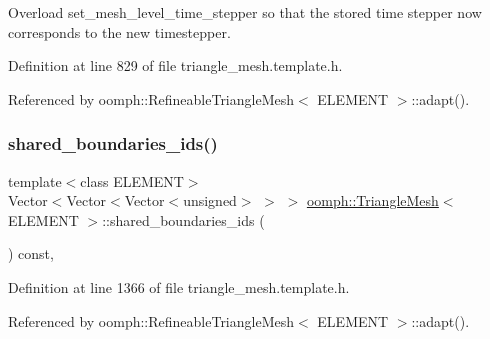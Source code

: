 Overload set\+\_\+mesh\+\_\+level\+\_\+time\+\_\+stepper so that the stored time stepper now corresponds to the new timestepper. 



Definition at line 829 of file triangle\+\_\+mesh.\+template.\+h.



Referenced by oomph\+::\+Refineable\+Triangle\+Mesh$<$ E\+L\+E\+M\+E\+N\+T $>$\+::adapt().

\mbox{\label{classoomph_1_1TriangleMesh_a89a3d87293ecec5b4b455377ccd4c9a4}} 
\subsubsection{\texorpdfstring{shared\+\_\+boundaries\+\_\+ids()}{shared\_boundaries\_ids()}\hspace{0.1cm}{\footnotesize\ttfamily [1/7]}}
{\footnotesize\ttfamily template$<$class E\+L\+E\+M\+E\+NT$>$ \\
Vector$<$Vector$<$Vector$<$unsigned$>$ $>$ $>$ \hyperlink{classoomph_1_1TriangleMesh}{oomph\+::\+Triangle\+Mesh}$<$ E\+L\+E\+M\+E\+NT $>$\+::shared\+\_\+boundaries\+\_\+ids (\begin{DoxyParamCaption}{ }\end{DoxyParamCaption}) const\hspace{0.3cm}{\ttfamily [inline]}, {\ttfamily [protected]}}



Definition at line 1366 of file triangle\+\_\+mesh.\+template.\+h.



Referenced by oomph\+::\+Refineable\+Triangle\+Mesh$<$ E\+L\+E\+M\+E\+N\+T $>$\+::adapt().

\mbox{\label{classoomph_1_1TriangleMesh_abdbc5649848391bfb94ebe6ff2ded1bc}} 
